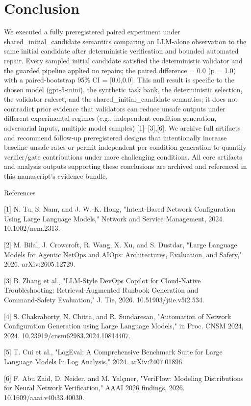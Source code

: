 \documentclass[conference]{IEEEtran}
\begin{document}
\section{Conclusion}
We executed a fully preregistered paired experiment under shared\_initial\_candidate semantics comparing an LLM‑alone observation to the same initial candidate after deterministic verification and bounded automated repair. Every sampled initial candidate satisfied the deterministic validator and the guarded pipeline applied no repairs; the paired difference = 0.0 (p = 1.0) with a paired‑bootstrap 95\% CI = [0.0,0.0]. This null result is specific to the chosen model (gpt‑5‑mini), the synthetic task bank, the deterministic selection, the validator ruleset, and the shared\_initial\_candidate semantics; it does not contradict prior evidence that validators can reduce unsafe outputs under different experimental regimes (e.g., independent condition generation, adversarial inputs, multiple model samples) [1]--[3],[6]. We archive full artifacts and recommend follow‑up preregistered designs that intentionally increase baseline unsafe rates or permit independent per‑condition generation to quantify verifier/gate contributions under more challenging conditions. All core artifacts and analysis outputs supporting these conclusions are archived and referenced in this manuscript's evidence bundle.

References

[1] N. Tu, S. Nam, and J. W.-K. Hong, "Intent‑Based Network Configuration Using Large Language Models," Network and Service Management, 2024. 10.1002/nem.2313.

[2] M. Bilal, J. Crowcroft, R. Wang, X. Xu, and S. Dustdar, "Large Language Models for Agentic NetOps and AIOps: Architectures, Evaluation, and Safety," 2026. arXiv:2605.12729.

[3] B. Zhang et al., "LLM‑Style DevOps Copilot for Cloud‑Native Troubleshooting: Retrieval‑Augmented Runbook Generation and Command‑Safety Evaluation," J. Tie, 2026. 10.51903/jtie.v5i2.534.

[4] S. Chakraborty, N. Chitta, and R. Sundaresan, "Automation of Network Configuration Generation using Large Language Models," in Proc. CNSM 2024, 2024. 10.23919/cnsm62983.2024.10814407.

[5] T. Cui et al., "LogEval: A Comprehensive Benchmark Suite for Large Language Models In Log Analysis," 2024. arXiv:2407.01896.

[6] F. Abu Zaid, D. Neider, and M. Yalçıner, "VeriFlow: Modeling Distributions for Neural Network Verification," AAAI 2026 findings, 2026. 10.1609/aaai.v40i33.40030.
\end{document}
